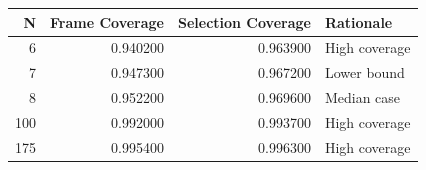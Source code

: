 \begin{tabular}{rrrl}
\toprule
N & Frame Coverage & Selection Coverage & Rationale \\
\midrule
6 & 0.940200 & 0.963900 & High coverage \\
7 & 0.947300 & 0.967200 & Lower bound \\
8 & 0.952200 & 0.969600 & Median case \\
100 & 0.992000 & 0.993700 & High coverage \\
175 & 0.995400 & 0.996300 & High coverage \\
\bottomrule
\end{tabular}
